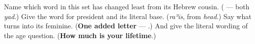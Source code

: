 \begin{tcolorbox}[breakable,colback=teal!4,colframe=teal!35!black,title={Before you move on}]
Name which word in this set has changed least from its Hebrew cousin. (\textbf{} — both \emph{yad}.) Give the word for president and its literal base. (\emph{raʾīs}, from \emph{head}.) Say what turns \textbf{} into its feminine. (\textbf{One added letter} — \textbf{}.) And give the literal wording of the age question. (\textbf{How much is your lifetime}.)
\end{tcolorbox}
